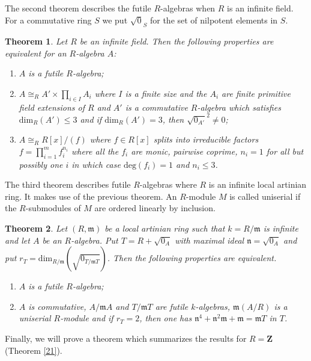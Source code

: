 \documentclass{amsart}
\theoremstyle{plain}
\newtheorem{theorem}{Theorem}[section]
\theoremstyle{definition}
\begin{document}
The second theorem describes the futile $R$-algebras when $R$ is an infinite field. For a commutative ring $S$ we put $\sqrt{0}_S$ for the set of
nilpotent elements in $S$.

\begin{theorem} \label{3}
Let $R$ be an infinite field. Then the following properties are equivalent for an $R$-algebra $A$:
\begin{enumerate}
 \item $A$ is a futile $R$-algebra;
 \item  $A \cong_R A' \times \prod_{i \in I} A_i$ where $I$ is a finite size and the $A_i$ are finite primitive field extensions of $R$ and $A'$ is a
commutative $R$-algebra which
satisfies $\mathrm{dim}_R(A') \leq 3$ and if $\mathrm{dim}_R(A')=3$, then $\sqrt{0_{A'}}^2 \neq 0$;
 \item $A \cong_R R[x]/(f)$ where $f \in R[x]$ splits into irreducible factors
$f= \prod_{i=1}^m f_i^{n_i}$ where all the $f_i$ are monic, pairwise coprime, $n_i=1$ for all but possibly one $i$ in which case $\mathrm{deg}(f_i)=1$
and $n_i \leq 3$.
\end{enumerate}  
\end{theorem}

The third theorem describes futile $R$-algebras where $R$ is an infinite local artinian ring. It makes use of the previous theorem. An $R$-module
$M$ is called uniserial if the $R$-submodules of $M$ are ordered linearly by inclusion.

\begin{theorem} \label{913}
Let $(R,{\mathfrak{m}})$ be a local artinian ring such that $k=R/{\mathfrak{m}}$ is infinite and let $A$ be an $R$-algebra. Put $T=R+\sqrt{0_A}$ with maximal ideal
$\mathfrak{n}=\sqrt{0_A}$ and put $r_T= \mathrm{dim}_{R/{\mathfrak{m}}}(\sqrt{0_{T/{\mathfrak{m}} T}})$. Then the following properties are
equivalent.
\begin{enumerate}
 \item $A$ is a futile $R$-algebra;
 \item $A$ is commutative, $A/{\mathfrak{m}} A$ and $T/{\mathfrak{m}} T$ are futile $k$-algebras, ${\mathfrak{m}} (A/R)$ is a uniserial $R$-module and
if $r_T=2$, then one has $\mathfrak{n}^4+\mathfrak{n}^2{\mathfrak{m}}+{\mathfrak{m}}={\mathfrak{m}} T$ in $T$.
\end{enumerate}
\end{theorem}

Finally, we will prove a theorem which summarizes the results for $R={\mathbf{Z}}$ (Theorem \ref{21}).
\end{document}
